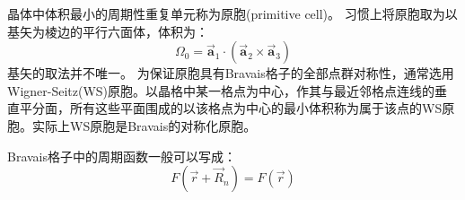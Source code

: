 晶体中体积最小的周期性重复单元称为原胞(primitive cell)。%
习惯上将原胞取为以基矢为棱边的平行六面体，体积为：
\begin{equation}
  \Omega_0=\vec{\mathbf a}_1\cdot(\vec{\mathbf a}_2\times\vec{\mathbf a}_3)
  \label{eq:vol_pri_lattice}
\end{equation}
基矢的取法并不唯一。%
为保证原胞具有Bravais格子的全部点群对称性，通常选用Wigner-Seitz(WS)原胞。以晶格中某一格点为中心，作其与最近邻格点连线的垂直平分面，所有这些平面围成的以该格点为中心的最小体积称为属于该点的WS原胞。实际上WS原胞是Bravais的对称化原胞。


Bravais格子中的周期函数一般可以写成：
\begin{equation}
  F(\vec r+\vec R_n)=F(\vec r)
  \label{eq:solid-4}
\end{equation}

